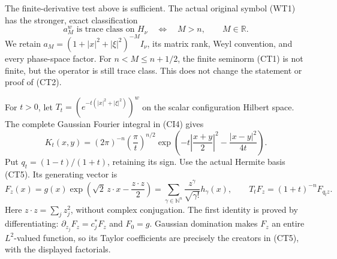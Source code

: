 \documentclass[
  11pt,
]{article}
\begin{document}
The finite-derivative test above is sufficient. The actual original
symbol (WT1) has the stronger, exact classification \[
 a_M^w\text{ is trace class on }H_\nu
             \quad\Longleftrightarrow\quad M>n,
             \qquad M\in\mathbb R.                            \tag{WT6}
\] We retain \(a_M=(1+|x|^2+|\xi|^2)^{-M}I_\nu\), its matrix rank, Weyl
convention, and every phase-space factor. For \(n<M\leq n+1/2\), the
finite seminorm (CT1) is not finite, but the operator is still trace
class. This does not change the statement or proof of (CT2).

For \(t>0\), let \(T_t=(e^{-t(|x|^2+|\xi|^2)})^w\) on the scalar
configuration Hilbert space. The complete Gaussian Fourier integral in
(CI4) gives \[
 K_t(x,y)=(2\pi)^{-n}\left(\frac\pi t\right)^{n/2}
 \exp\left(-t\left|\frac{x+y}{2}\right|^2
                 -\frac{|x-y|^2}{4t}\right).                  \tag{WT7}
\] Put \(q_t=(1-t)/(1+t)\), retaining its sign. Use the actual Hermite
basis (CT5). Its generating vector is \[
 F_z(x)=g(x)\exp\left(\sqrt2\,z\cdot x-\frac{z\cdot z}{2}\right)
       =\sum_{\gamma\in\mathbb N^n}
          \frac{z^\gamma}{\sqrt{\gamma!}}h_\gamma(x),\qquad
 T_tF_z=(1+t)^{-n}F_{q_tz}.                                   \tag{WT8}
\] Here \(z\cdot z=\sum_jz_j^2\), without complex conjugation. The first
identity is proved by differentiating: \(\partial_{z_j}F_z=c_j^*F_z\)
and \(F_0=g\). Gaussian domination makes \(F_z\) an entire
\(L^2\)-valued function, so its Taylor coefficients are precisely the
creators in (CT5), with the displayed factorials.
\end{document}
